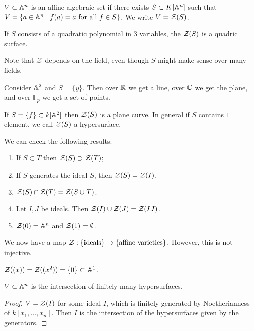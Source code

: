 \documentclass[10pt, twoside]{article}
\newcommand{\F}{\mathbb{F}}
\begin{document}
        \begin{defn} $V \subset \mathbb{A}^n$ is an affine algebraic set if there
        exists $S \subset K[\mathbb{A}^n]$ such that $V = \{a \in \mathbb{A}^n \mid f(a) = a
    \text{ for all } f \in S \}$. We write $V = \mathcal{Z}(S)$.  \end{defn}

        \begin{exm} If $S$ consists of a quadratic polynomial in $3$ variables,
        the $\mathcal{Z}(S)$ is a quadric surface.  \end{exm}

        Note that $\mathcal{Z}$ depends on the field, even though $S$ might make
        sense over many fields.  \begin{exm} Consider $\mathbb{A}^2$ and $S = \{y\}$.
            Then over $\mathbb{R}$ we get a line, over $\mathbb{C}$ we get the plane, and over
            $\F_p$ we get a set of points.  \end{exm}

        \begin{exm} If $S = \{f\} \subset k[\mathbb{A}^2]$ then $\mathcal{Z}(S)$ is a plane
        curve. In general if $S$ contains $1$ element, we call $\mathcal{Z}(S)$ a
    hypersurface.  \end{exm}

        We can check the following results: \begin{enumerate} \item If $S
            \subset T$ then $\mathcal{Z}(S) \supset \mathcal{Z}(T)$; \item If $S$
            generates the ideal $S$, then $\mathcal{Z}(S) = \mathcal{Z}(I)$.  \item
            $\mathcal{Z}(S) \cap \mathcal{Z}(T) = \mathcal{Z}(S \cup T)$.  \item Let $I,J$ be
    ideals. Then $\mathcal{Z}(I) \cup \mathcal{Z}(J) = \mathcal{Z}(IJ)$.  \item $\mathcal{Z}(0) =
    \mathbb{A}^n$ and $\mathcal{Z}(1) = \emptyset$.  \end{enumerate}

        We now have a map $\mathcal{Z}: \{\text{ideals}\} \to \{\text{affine
        varieties}\}$. However, this is not injective.

        \begin{exm} $\mathcal{Z}((x)) = \mathcal{Z}((x^2)) = \{0\} \subset \mathbb{A}^1$.
        \end{exm}

        \begin{prop} $V \subset \mathbb{A}^n$ is the intersection of finitely many
            hypersurfaces.  \begin{proof} $V = \mathcal{Z}(I)$ for some ideal $I$,
                which is finitely generated by Noetherianness of $k[x_1,
                \ldots, x_n]$. Then $I$ is the intersection of the
                hypersurfaces given by the generators.  \end{proof} \end{prop}
\end{document}
